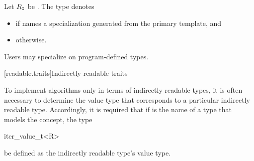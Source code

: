 %
\pnum
Let $R_\tcode{I}$ be .
The type  denotes
\begin{itemize}
\item
{}
if  names a specialization
generated from the primary template, and

\item
{} otherwise.
\end{itemize}

\pnum
Users may specialize  on program-defined types.

[readable.traits]{Indirectly readable traits}

\pnum
To implement algorithms only in terms of indirectly readable types,
it is often necessary
to determine the value type that corresponds to
a particular indirectly readable type.
Accordingly, it is required that if  is the name of a type that
models the  concept,
the type
\begin{codeblock}
iter_value_t<R>
\end{codeblock}
be defined as the indirectly readable type's value type.

